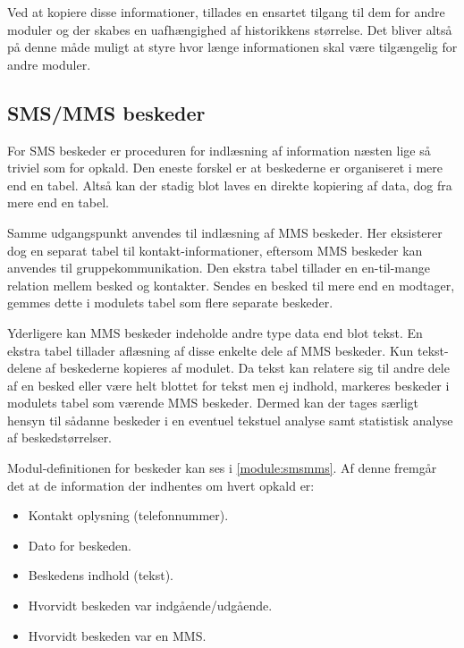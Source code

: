 Ved at kopiere disse informationer, tillades en ensartet tilgang til dem for andre moduler og der skabes en uafhængighed af historikkens størrelse.
Det bliver altså på denne måde muligt at styre hvor længe informationen skal være tilgængelig for andre moduler.



\subsection{SMS/MMS beskeder}
For SMS beskeder er proceduren for indlæsning af information næsten lige så triviel som for opkald.
Den eneste forskel er at beskederne er organiseret i mere end en tabel.
Altså kan der stadig blot laves en direkte kopiering af data, dog fra mere end en tabel.

Samme udgangspunkt anvendes til indlæsning af MMS beskeder.
Her eksisterer dog en separat tabel til kontakt-informationer, eftersom MMS beskeder kan anvendes til gruppekommunikation.
Den ekstra tabel tillader en en-til-mange relation mellem besked og kontakter.
Sendes en besked til mere end en modtager, gemmes dette i modulets tabel som flere separate beskeder.

Yderligere kan MMS beskeder indeholde andre type data end blot tekst.
En ekstra tabel tillader aflæsning af disse enkelte dele af MMS beskeder.
Kun tekst-delene af beskederne kopieres af modulet.
Da tekst kan relatere sig til andre dele af en besked eller være helt blottet for tekst men ej indhold, markeres beskeder i modulets tabel som værende MMS beskeder.
Dermed kan der tages særligt hensyn til sådanne beskeder i en eventuel tekstuel analyse samt statistisk analyse af beskedstørrelser.

Modul-definitionen for beskeder kan ses i \cref{module:smsmms}.
Af denne fremgår det at de information der indhentes om hvert opkald er:
\begin{itemize}
\item Kontakt oplysning (telefonnummer).
\item Dato for beskeden.
\item Beskedens indhold (tekst).
\item Hvorvidt beskeden var indgående/udgående.
\item Hvorvidt beskeden var en MMS.
\end{itemize}


